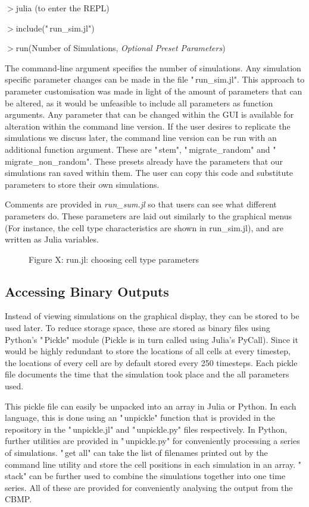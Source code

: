 \documentclass[11.5pt]{article}
\begin{document}
$>$julia (to enter the REPL)

$>$include("\,run\_sim.jl")

$>$run(Number of Simulations, {\itshape Optional Preset Parameters})

The command-line argument specifies the number of simulations. Any 
simulation specific parameter changes can be made in the file 
"\,run\_sim.jl". This approach to parameter customisation was made in 
light of the amount of parameters that can be altered, as it would be 
unfeasible to include all parameters as function arguments. Any 
parameter that can be changed within the GUI is available for alteration 
within the command line version. If the user desires to replicate the 
simulations we discuss later, the command line version can be run with 
an additional function argument. These are "\,stem", "\,migrate\_random" 
and "\,migrate\_non\_random". These presets already have the parameters 
that our simulations ran saved within them. The user can copy this code 
and substitute parameters to store their own simulations.

Comments are provided in {\itshape run\_sum.jl} so that users can see 
what different parameters do. These parameters are laid out similarly to 
the graphical menus (For instance, the cell type characteristics are 
shown in run\_sim.jl), and are written as Julia variables.

\begin{figure}[H]
\centering
\caption{Figure X: run.jl: choosing cell type parameters}
\end{figure}

\subsection{Accessing Binary Outputs}
Instead of viewing simulations on the graphical display, they can be 
stored to be used later. To reduce storage space, these are stored as 
binary files using Python's "\,Pickle" module (Pickle is in turn called 
using Julia's PyCall). Since it would be highly redundant to store the 
locations of all cells at every timestep, the locations of every cell 
are by default stored every 250 timesteps. Each pickle file documents 
the time that the simulation took place and the all parameters used.

This pickle file can easily be unpacked into an array in Julia or 
Python. In each language, this is done using an "\,unpickle" function 
that is provided in the repository in the "\,unpickle.jl" and 
"\,unpickle.py" files respectively. In Python, further utilities are 
provided in "\,unpickle.py" for conveniently processing a series of 
simulations. "\,get all" can take the list of filenames printed out by 
the command line utility and store the cell positions in each simulation 
in an array. "\,stack" can be further used to combine the simulations 
together into one time series. All of these are provided for 
conveniently analysing the output from the CBMP.
\end{document}

